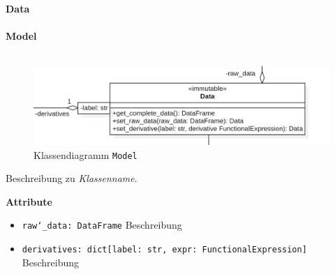 \documentclass{article}
\begin{document}
\newpage
\textbf{\large{Data}}\\\\
\textbf{\large{Model}}\\\\
\begin{figure}[H]%
    \centering
    \includegraphics[width=13cm]{entwurf/Entwurf_dokument/img/cls/model/Data.png}
    \caption{Klassendiagramm \texttt{Model}}
\end{figure}

Beschreibung zu \textit{Klassenname}.
\newline \newline

\textbf{{Attribute}}
\begin{itemize}
\item \texttt{raw\char`_data: DataFrame} \newline Beschreibung
\item \texttt{derivatives: dict[label: str, expr: FunctionalExpression]} \newline Beschreibung
\\\\
\end{itemize}
\end{document}
